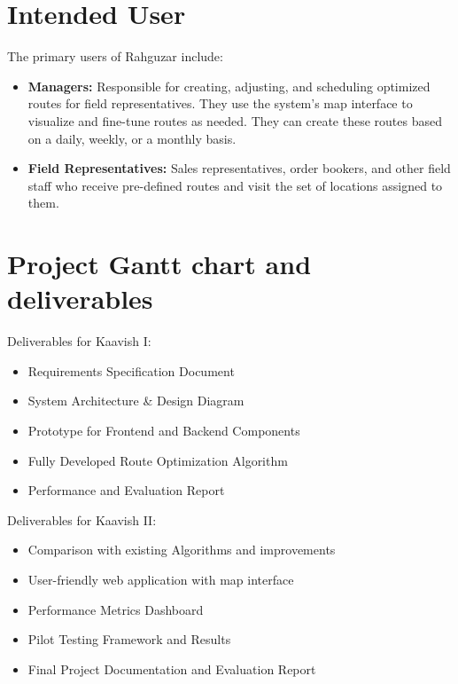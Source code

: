
\section{Intended User}

The primary users of Rahguzar include:

\begin{itemize}

    \item \textbf{Managers:} Responsible for creating, adjusting, and scheduling optimized routes for field representatives. They use the system’s map interface to visualize and fine-tune routes as needed. They can create these routes based on a daily, weekly, or a monthly basis.

    \item \textbf{Field Representatives:} Sales representatives, order bookers, and other field staff who receive pre-defined routes and visit the set of locations assigned to them.

    
\end{itemize}


\section{Project Gantt chart and deliverables}

Deliverables for Kaavish I:
\begin{itemize}
    \item Requirements Specification Document
    \item System Architecture \& Design Diagram
    \item Prototype for Frontend and Backend Components
    \item Fully Developed Route Optimization Algorithm
    \item Performance and Evaluation Report
\end{itemize}
Deliverables for Kaavish II:
\begin{itemize}
    \item Comparison with existing Algorithms and improvements
    \item User-friendly web application with map interface
    \item Performance Metrics Dashboard
    \item Pilot Testing Framework and Results
    \item Final Project Documentation and Evaluation Report
\end{itemize}



